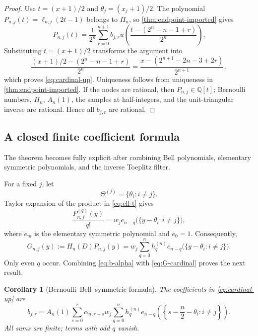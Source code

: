 \documentclass[11pt,oneside]{article}
\newtheorem{corollary}[theorem]{Corollary}
\theoremstyle{definition}
\theoremstyle{remark}
\newcommand{\1}{\mathbf{1}}
\begin{document}
\begin{proof}
Use $t=(x+1)/2$ and $\theta_j=(x_j+1)/2$.  The polynomial
$P_{n,j}(t)=\ell_{n,j}(2t-1)$ belongs to $\Pi_n$, so
\cref{thm:endpoint-imported} gives
\[
 P_{n,j}(t)=\frac1{2^n}\sum_{r=0}^{n+1}b_{j,r}
 u\!\left(\frac{t-(2^n-n-1+r)}{2^n}\right).
\]
Substituting $t=(x+1)/2$ transforms the argument into
\[
 \frac{(x+1)/2-(2^n-n-1+r)}{2^n}
 =\frac{x-(2^{n+1}-2n-3+2r)}{2^{n+1}},
\]
which proves \eqref{eq:cardinal-up}.  Uniqueness follows from uniqueness in
\cref{thm:endpoint-imported}.  If the nodes are rational, then
$P_{n,j}\in\mathbb Q[t]$; Bernoulli numbers, $H_n$, $A_n(1)$, the samples at
half-integers, and the unit-triangular inverse are rational.  Hence all
$b_{j,r}$ are rational.
\end{proof}

\subsection{A closed finite coefficient formula}

The theorem becomes fully explicit after combining Bell polynomials,
elementary symmetric polynomials, and the inverse Toeplitz filter.

For a fixed $j$, let
\[
 \Theta^{(j)}=\{\theta_i:i\ne j\}.
\]
Taylor expansion of the product in \eqref{eq:ell-t} gives
\begin{equation}
 \frac{P_{n,j}^{(q)}(y)}{q!}
 =w_j e_{n-q}\bigl(\{y-\theta_i:i\ne j\}\bigr),
 \label{eq:derivative-elementary}
\end{equation}
where $e_m$ is the elementary symmetric polynomial and $e_0=1$.
Consequently,
\begin{equation}
 G_{n,j}(y):=H_n(D)P_{n,j}(y)
 =w_j\sum_{q=0}^n h_q^{(n)}
 e_{n-q}\bigl(\{y-\theta_i:i\ne j\}\bigr).
 \label{eq:G-cardinal}
\end{equation}
Only even $q$ occur.  Combining \eqref{eq:b-alpha} with
\eqref{eq:G-cardinal} proves the next result.

\begin{corollary}[Bernoulli--Bell--symmetric formula]
\label{cor:explicit-b}
The coefficients in \eqref{eq:cardinal-up} are
\begin{equation}
 \boxed{
 b_{j,r}=A_n(1)\sum_{s=0}^r\alpha_{n,r-s}w_j
 \sum_{q=0}^n h_q^{(n)}
 e_{n-q}\!\left(\left\{s-\frac n2-\theta_i:i\ne j\right\}\right).}
 \label{eq:explicit-b}
\end{equation}
All sums are finite; terms with odd $q$ vanish.
\end{corollary}
\end{document}
